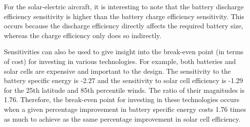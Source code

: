 For the solar-electric aircraft, it is interesting to note that the battery discharge efficiency sensitivity is higher than the battery charge efficiency sensitivity.
This occurs because the discharge efficiency directly affects the required battery size, whereas the charge efficiency only does so indirectly. 

Sensitivities can also be used to give insight into the break-even point (in terms of cost) for investing in various technologies.  
For example, both batteries and solar cells are expensive and important to the design.  
The sensitivity to the battery specific energy is -2.27 and the sensitivity to solar cell efficiency is -1.29 for the 25th latitude and 85th percentile winds. 
The ratio of their magnitudes is 1.76.  
Therefore, the break-even point for investing in these technologies occurs when a given percentage improvement in battery specific energy costs 1.76 times as much to achieve as the same percentage improvement in solar cell efficiency. 

\newpage




